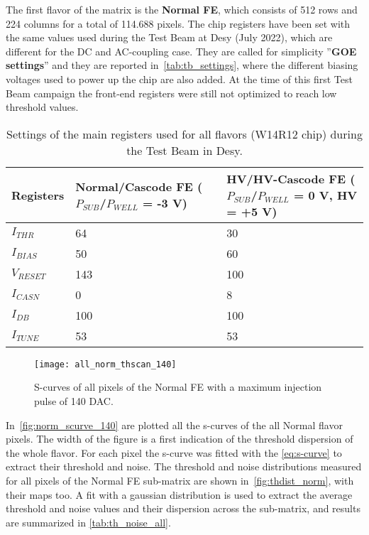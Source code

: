 The first flavor of the matrix is the \textbf{Normal FE}, which consists of 512 rows and 224 columns for a total of 114.688 pixels. The chip registers have been set with the same values used during the Test Beam at Desy (July 2022), which are different for the DC and AC-coupling case. They are called for simplicity ''\textbf{GOE settings}'' and they are reported in~\autoref{tab:tb_settings}, where the different biasing voltages used to power up the chip are also added. At the time of this first Test Beam campaign the front-end registers were still not  optimized to reach low threshold values. 

\begin{table}[h!]
\centering
\begin{tabular}{C{3.2cm}|C{3.7cm}|C{3.5cm}}
\hline
Registers & Normal/Cascode FE ($P_{SUB}$/$P_{WELL}$ = -3 V) & HV/HV-Cascode FE ($P_{SUB}$/$P_{WELL}$ = 0 V, HV = +5 V)\\[2ex]
\hline
\hline
$I_{THR}$ & 64 & 30\\[0.5ex]
\hline
$I_{BIAS}$ & 50 & 60\\
\hline
$V_{RESET}$ & 143 & 100\\
\hline
$I_{CASN}$ & 0 & 8\\
\hline
$I_{DB}$ & 100 & 100\\
\hline
$I_{TUNE}$ & 53 & 53\\
\hline
\hline
\end{tabular}
\caption{Settings of the main registers used for all flavors (W14R12 chip) during the Test Beam in Desy.}
\label{tab:tb_settings}
\end{table}


\begin{figure}[h!]
\centering
\texttt{[image: all\_norm\_thscan\_140]}
\caption{S-curves of all pixels of the Normal FE with a maximum injection pulse of 140 DAC.}
\label{fig:norm_scurve_140}
\end{figure}


In~\autoref{fig:norm_scurve_140} are plotted all the s-curves of the all Normal flavor pixels. The width of the figure is a first indication of the threshold dispersion of the whole flavor.
For each pixel the s-curve was fitted with the \autoref{eq:s-curve} to extract their threshold and noise.  
The threshold and noise distributions measured for all pixels of the Normal FE sub-matrix are shown in~\autoref{fig:thdist_norm},  with their maps too. A fit with a gaussian distribution is used to extract the average threshold and noise values and their dispersion across the sub-matrix, and results are summarized in \autoref{tab:th_noise_all}.

